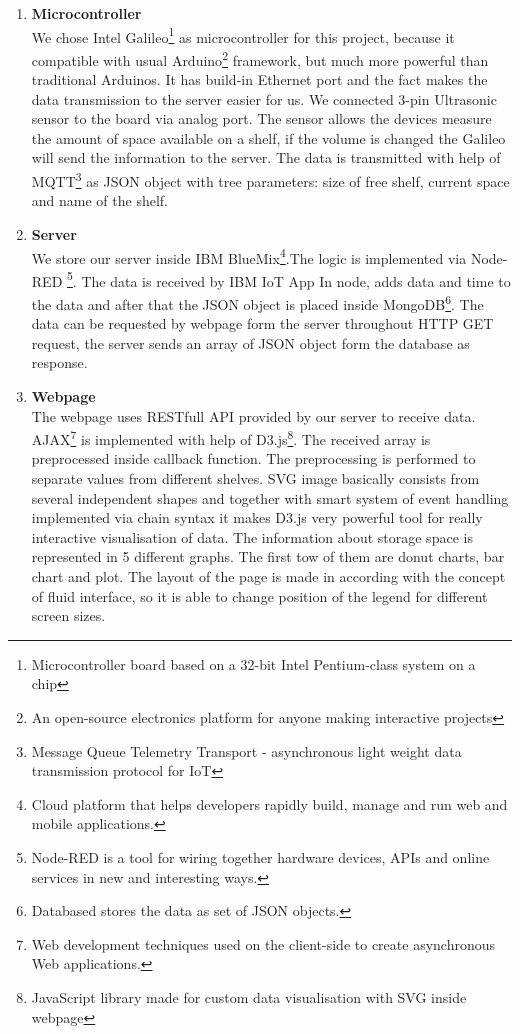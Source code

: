 \documentclass[english]{article}
\begin{document}
\begin{enumerate}
\item \textbf{Microcontroller}\\
We chose Intel Galileo\footnote{Microcontroller board based on a 32-bit Intel Pentium-class system on a chip} as microcontroller for this project, because it compatible with usual Arduino\footnote{An open-source electronics platform for anyone making interactive projects} framework, but much more powerful than traditional Arduinos. It has build-in Ethernet port and the fact makes the data transmission to the server easier for us. We connected 3-pin Ultrasonic sensor to the board via analog port. The sensor allows the devices measure the amount of space available on a shelf, if the volume is changed the Galileo will send the information to the server. The data is transmitted with help of MQTT\footnote{Message Queue Telemetry Transport - asynchronous light weight data transmission protocol for IoT} as JSON object with tree parameters: size of free shelf, current space and name of the shelf.
\item \textbf{Server}\\
We store our server inside IBM BlueMix\footnote{Cloud platform that helps developers rapidly build, manage and run web and mobile applications.}.The logic is implemented via Node-RED
\footnote{Node-RED is a tool for wiring together hardware devices, APIs and online services in new and interesting ways.}. The data is received by IBM IoT App In node, adds data and time to the data and after that the JSON object is placed inside MongoDB\footnote{Databased stores the data as set of JSON objects.}. The data can be requested by webpage form the server throughout HTTP GET request, the server sends an array of JSON object form the database as response.
\item \textbf{Webpage}\\
The webpage uses RESTfull API provided by our server to receive data. AJAX\footnote{Web development techniques used on the client-side to create asynchronous Web applications.} is implemented with help of D3.js\footnote{JavaScript library made for custom data visualisation with SVG inside webpage}. The received array is preprocessed inside callback function. The preprocessing is performed to separate values from different shelves. SVG image basically consists from several independent shapes and together with smart system of event handling implemented via chain syntax it makes D3.js very powerful tool for really interactive visualisation of data. The information about storage space is represented in 5 different graphs. The first tow of them are donut charts, bar chart and plot.
The layout of the page is made in according with the concept of fluid interface, so it is able to change position of the legend for different screen sizes.
\end{enumerate}
\end{document}

